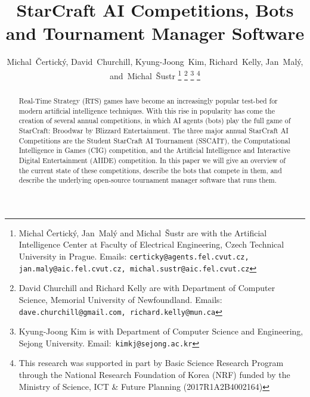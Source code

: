 \documentclass[journal]{IEEEtran}
\begin{document}
\title{StarCraft AI Competitions, Bots\\ and Tournament Manager Software}

\author{Michal~\v{C}ertick\'{y}, David~Churchill, Kyung-Joong~Kim, Richard~Kelly, Jan~Mal\'{y}, and~Michal~\v{S}ustr%
\thanks{Michal \v{C}ertick\'{y}, Jan~Mal\'{y} and Michal~\v{S}ustr are with the Artificial Intelligence Center at Faculty of Electrical Engineering, Czech Technical University in Prague. Emails: {\scriptsize \tt{certicky@agents.fel.cvut.cz}, \tt{jan.maly@aic.fel.cvut.cz}, \tt{michal.sustr@aic.fel.cvut.cz}}}%
\thanks{David Churchill and Richard Kelly are with Department of Computer Science, Memorial University of Newfoundland. Emails: {\scriptsize\tt{dave.churchill@gmail.com}, \tt{richard.kelly@mun.ca}}}%
\thanks{Kyung-Joong Kim is with Department of Computer Science and Engineering, Sejong University. Email:~\tt{\scriptsize kimkj@sejong.ac.kr}}
\thanks{This research was supported in part by Basic Science Research Program through the National Research Foundation of Korea (NRF) funded by the Ministry of Science, ICT \& Future Planning (2017R1A2B4002164)}%
}

% 


\maketitle
\begin{abstract}
Real-Time Strategy (RTS) games have become an increasingly popular test-bed for modern artificial intelligence techniques. With this rise in popularity has come the creation of several annual competitions, in which AI agents (bots) play the full game of StarCraft: Broodwar by Blizzard Entertainment. The three major annual StarCraft AI Competitions are the Student StarCraft AI Tournament (SSCAIT), the Computational Intelligence in Games (CIG) competition, and the Artificial Intelligence and Interactive Digital Entertainment (AIIDE) competition. In this paper we will give an overview of the current state of these competitions, describe the bots that compete in them, and describe the underlying open-source tournament manager software that runs them. 
\end{abstract}
\end{document}
